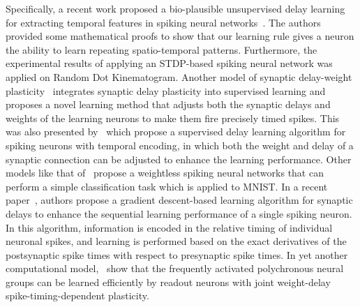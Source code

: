 \documentclass[brainsci, %
               review,submit,pdftex,moreauthors
               ]{Definitions/mdpi}
\begin{document}
Specifically, a recent work proposed a bio-plausible unsupervised delay learning for extracting temporal features in spiking neural networks~\citep{nadafian_bio-plausible_2020}. The authors provided some mathematical proofs to show that our learning rule gives a neuron the ability to learn repeating spatio-temporal patterns. Furthermore, the experimental results of applying an STDP-based spiking neural network was applied on Random Dot Kinematogram. Another model of synaptic delay-weight plasticity~\citep{zhang_supervised_2020} integrates synaptic delay plasticity into supervised learning and proposes a novel learning method that adjusts both the synaptic delays and weights of the learning neurons to make them fire precisely timed spikes. 
This was also presented by~\citep{wang_delay_2019} which propose a supervised delay learning algorithm for spiking neurons with temporal encoding, in which both the weight and delay of a synaptic connection can be adjusted to enhance the learning performance. Other models like that of~\citep{hazan_memory_2022} propose a weightless spiking neural networks that can perform a simple classification task which is applied to MNIST.
In a recent paper~\citep{luo_supervised_2022}, authors propose a gradient descent-based learning algorithm for synaptic delays to enhance the sequential learning performance of a single spiking neuron. In this algorithm, information is encoded in the relative timing of individual neuronal spikes, and learning is performed based on the exact derivatives of the postsynaptic spike times with respect to presynaptic spike times.
In yet another computational model,~\citet{sun_learning_2016} show that the frequently activated polychronous neural groups can be learned efficiently by readout neurons with joint weight-delay spike-timing-dependent plasticity.

\end{document}
